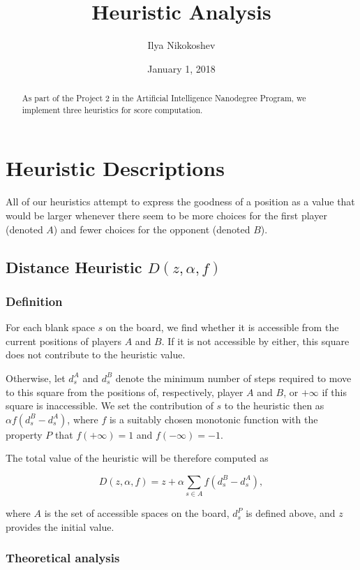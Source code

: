 \documentclass[oneside]{article}   	%
\title{Heuristic Analysis}
\author{Ilya Nikokoshev}
\date{January 1, 2018}
\begin{document}
\maketitle

\begin{abstract}
As part of the Project 2 in the Artificial Intelligence Nanodegree Program, we implement three heuristics for score computation.
\end{abstract}

\tableofcontents

\section{Heuristic Descriptions}

All of our heuristics attempt to express the goodness of a position as a value that would be larger whenever there seem to be more choices for the first player (denoted $A$) and fewer choices for the opponent (denoted $B$).


\subsection{Distance Heuristic $D(z, \alpha, f)$}

\subsubsection{Definition}

For each blank space $s$ on the board, we find whether it is accessible from the current positions of players $A$ and $B$. If it is not accessible by either, this square does not contribute to the heuristic value. 

Otherwise, let $d^A_s$ and $d^B_s$ denote the minimum number of steps required to move to this square from the positions of, respectively, player $A$ and $B$, or $+\infty$ if this square is inaccessible. We set the contribution of $s$ to the heuristic then as $\alpha f(d^B_s-d^A_s)$,
where $f$ is a suitably chosen monotonic function with the property $P$ that $f(+\infty) = 1$ and $f(-\infty) = -1$. 

The total value of the heuristic will be therefore computed as 

$$D(z, \alpha, f) = z + \alpha\sum_{s\in A}f(d^B_s-d^A_s), $$

where $A$ is the set of accessible spaces on the board, $d^P_s$ is defined above, and $z$ provides the initial value.

\subsubsection{Theoretical analysis}
\end{document}
